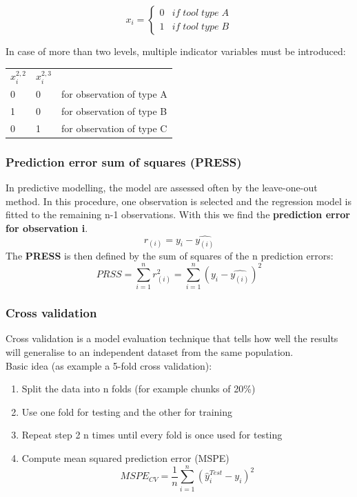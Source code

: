 \begin{equation*}
x_i = \begin{cases}
0 & if \; tool\; type\; A \\
1 & if\; tool\; type\; B
\end{cases}
\end{equation*}

In case of more than two levels, multiple indicator variables must be introduced:

\begin{tabular}{lll}
	$x_i^{2,2}$ & $x_i^{2,3}$  &  \\ 
	0 & 0 & for observation of type A \\ 
	1 & 0 & for observation of type B \\ 
	0 & 1 & for observation of type C \\ 
\end{tabular}

\subsubsection{Prediction error sum of squares (PRESS)}
In predictive modelling, the model are assessed often by the leave-one-out method. In this procedure, one observation is selected and the regression model is fitted to the remaining n-1 observations. With this we find the \textbf{prediction error for observation i}.
\begin{equation*}
r_{(i)}=y_i-\hat{y_(i)}
\end{equation*}
The \textbf{PRESS} is then defined by the sum of squares of the n prediction errors:
\begin{equation*}
PRSS = \sum_{i=1}^{n}r^2_{(i)} = \sum_{i=1}^{n}(y_i-\hat{y_{(i)}})^2
\end{equation*}

\subsubsection{Cross validation}
Cross validation is a model evaluation technique that tells how well the results will generalise to an independent dataset from the same population.\\
Basic idea (as example a 5-fold cross validation):
\begin{enumerate}
	\tightlist
	\item Split the data into n folds (for example chunks of 20\%)
	\item Use one fold for testing and the other for training
	\item Repeat step 2 n times until every fold is once used for testing
	\item Compute mean squared prediction error (MSPE)
	\begin{equation*}
		MSPE_{CV}=\frac{1}{n}\sum_{i=1}^{n}(\hat{y}_i^{Test} - y_i)^2
	\end{equation*}
\end{enumerate}

